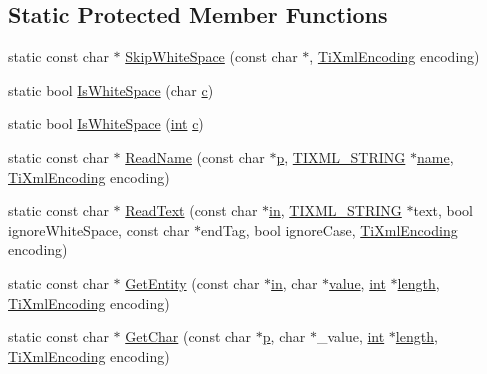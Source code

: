 \subsection*{Static Protected Member Functions}
\begin{DoxyCompactItemize}
\item 
static const char $\ast$ \hyperlink{class_ti_xml_base_a6849556ca97c0a172c6b996f08287ee1}{Skip\-White\-Space} (const char $\ast$, \hyperlink{tinyxml_8h_a88d51847a13ee0f4b4d320d03d2c4d96}{Ti\-Xml\-Encoding} encoding)
\item 
static bool \hyperlink{class_ti_xml_base_af56296d561c0bab4bc8e198cdcf5c48e}{Is\-White\-Space} (char \hyperlink{glew_8h_ae0f40feefa74d9cb1721a009573cfce5}{c})
\item 
static bool \hyperlink{class_ti_xml_base_a3de391ea9f4c4a8aa10d04480b048795}{Is\-White\-Space} (\hyperlink{wglew_8h_a500a82aecba06f4550f6849b8099ca21}{int} \hyperlink{glew_8h_ae0f40feefa74d9cb1721a009573cfce5}{c})
\item 
static const char $\ast$ \hyperlink{class_ti_xml_base_a910e1664e0d6a4da5d4d1bfaa51130fe}{Read\-Name} (const char $\ast$\hyperlink{glew_8h_aa5367c14d90f462230c2611b81b41d23}{p}, \hyperlink{tinyxml_8h_a92bada05fd84d9a0c9a5bbe53de26887}{T\-I\-X\-M\-L\-\_\-\-S\-T\-R\-I\-N\-G} $\ast$\hyperlink{fmod__codec_8h_a5c4947d4516dd7cfa3505ce3a648a4ef}{name}, \hyperlink{tinyxml_8h_a88d51847a13ee0f4b4d320d03d2c4d96}{Ti\-Xml\-Encoding} encoding)
\item 
static const char $\ast$ \hyperlink{class_ti_xml_base_a7f9beef90db30fa63dd35b3f992a30ca}{Read\-Text} (const char $\ast$\hyperlink{glew_8h_a83ad0ee7f1e06b59c90271716e689080}{in}, \hyperlink{tinyxml_8h_a92bada05fd84d9a0c9a5bbe53de26887}{T\-I\-X\-M\-L\-\_\-\-S\-T\-R\-I\-N\-G} $\ast$text, bool ignore\-White\-Space, const char $\ast$end\-Tag, bool ignore\-Case, \hyperlink{tinyxml_8h_a88d51847a13ee0f4b4d320d03d2c4d96}{Ti\-Xml\-Encoding} encoding)
\item 
static const char $\ast$ \hyperlink{class_ti_xml_base_a44f75cc7a45a97a09e509dc4c8c127e0}{Get\-Entity} (const char $\ast$\hyperlink{glew_8h_a83ad0ee7f1e06b59c90271716e689080}{in}, char $\ast$\hyperlink{fmod__dsp_8h_a6a4f8a1a444e9080b297963b3db29fe0}{value}, \hyperlink{wglew_8h_a500a82aecba06f4550f6849b8099ca21}{int} $\ast$\hyperlink{fmod__codec_8h_a921fa83f7755f0139c84ba1831417a2e}{length}, \hyperlink{tinyxml_8h_a88d51847a13ee0f4b4d320d03d2c4d96}{Ti\-Xml\-Encoding} encoding)
\item 
static const char $\ast$ \hyperlink{class_ti_xml_base_a5b0fde72d6f662ae1fd6303195d2159b}{Get\-Char} (const char $\ast$\hyperlink{glew_8h_aa5367c14d90f462230c2611b81b41d23}{p}, char $\ast$\-\_\-value, \hyperlink{wglew_8h_a500a82aecba06f4550f6849b8099ca21}{int} $\ast$\hyperlink{fmod__codec_8h_a921fa83f7755f0139c84ba1831417a2e}{length}, \hyperlink{tinyxml_8h_a88d51847a13ee0f4b4d320d03d2c4d96}{Ti\-Xml\-Encoding} encoding)

\end{DoxyCompactItemize}
